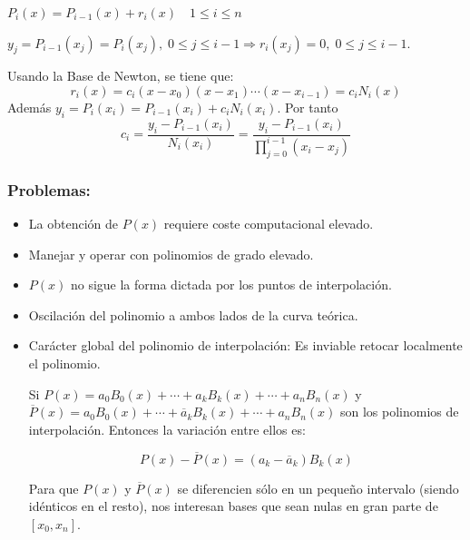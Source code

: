 \documentclass[twoside]{report}
\newcommand{\colocapdf}[2]{\quad\pdfimage width #2 {#1.pdf}}
\begin{document}
\begin{df}
$P_i(x)=P_{i-1}(x)+r_i(x) \quad 1\leq i\leq n$
\end{df}

\vspace{0.3cm}

$y_j=P_{i-1}(x_j)=P_i(x_j), \; 0\leq j\leq i-1 \Rightarrow r_i(x_j)=0,\; 0\leq j\leq i-1.$

Usando la Base de Newton, se tiene que:
$$r_i(x)=c_i(x-x_0)(x-x_1)\cdots (x-x_{i-1})=c_iN_i(x)$$
Adem\'{a}s $y_i=P_i(x_i)=P_{i-1}(x_i)+c_i N_i(x_i).$ Por tanto
$$c_i=\frac{y_i-P_{i-1}(x_i)}{N_i(x_i)}=\frac{y_i-P_{i-1}(x_i)}{\prod_{j=0}^{i-1} (x_i-x_j)}$$

\subsubsection{Problemas:}

\begin{itemize}
\item La obtenci\'{o}n de $P(x)$ requiere coste computacional elevado.
\item Manejar y operar con polinomios de grado elevado.
\item $P(x)$ no sigue la forma dictada por los puntos de interpolaci\'{o}n.


\item Oscilaci\'{o}n del polinomio a ambos lados de la curva te\'{o}rica.

\item Car\'{a}cter global del polinomio de interpolaci\'{o}n: Es inviable retocar localmente el polinomio.


Si $P(x)= a_0 B_0(x)+\cdots+a_kB_k(x)+\cdots +a_n B_n(x)$ y $\overline{P}(x)= a_0 B_0(x)+\cdots+\overline{a}_kB_k(x)+\cdots +a_n B_n(x)$ son los polinomios de interpolaci\'{o}n. Entonces la variaci\'{o}n entre ellos es:

$$P(x)-\overline{P}(x)= (a_k-\overline{a}_k) B_k(x)$$

Para que $P(x)$ y $\overline{P}(x)$ se diferencien s\'{o}lo en un peque\~{n}o intervalo (siendo id\'{e}nticos en el resto), nos interesan bases que sean nulas en gran parte de $[x_0,x_n]$.
\end{itemize}
\end{document}
